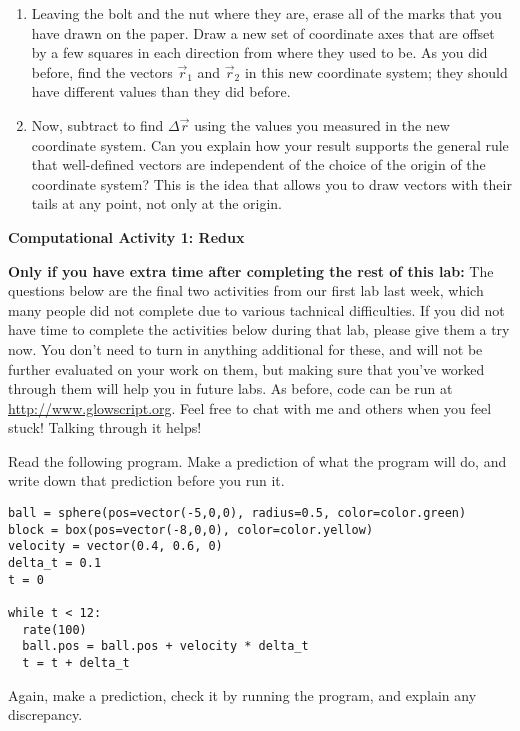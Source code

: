 \documentclass[11pt]{article}
\begin{document}
\begin{enumerate}
\item Leaving the bolt and the nut where they are, erase all of the marks
  that you have drawn on the paper.  Draw a new set of coordinate axes
  that are offset by a few squares in each direction from where they used 
  to be.  As you did before, find the vectors ${\vec{r}_1}$ and ${\vec{r}_2}$ 
  in this new coordinate system; they should have different values
  than they did before. 

\item Now, subtract to find $\Delta {\vec r}$ using the values you measured
  in the new coordinate system.  Can you explain how your result supports the 
  general rule that well-defined vectors are independent of the choice of the 
  origin of the coordinate system?  This is the idea that allows you to
  draw vectors with their tails at any point, not only at the origin.

\end{enumerate}







\newpage

\begin{center}
\medskip
{\bf{Computational Activity 1: Redux}} 
\end{center}
\medskip
\textbf{Only if you have extra time after completing the rest of this lab:} The questions below are the final two activities from our first lab last week, which many people did not complete due to various tachnical difficulties. If you did not have time to complete the activities below during that lab, please give them a try now. You don't need to turn in anything additional for these, and will not be further evaluated on your work on them, but making sure that you've worked through them will help you in future labs. As before, code can be run at \url{http://www.glowscript.org}. Feel free to chat with me and others when you feel stuck! Talking through it helps!




Read the following program. Make a prediction of what the program will do, and write down that prediction 
before you run it. 
{\small{
\begin{verbatim}
ball = sphere(pos=vector(-5,0,0), radius=0.5, color=color.green)
block = box(pos=vector(-8,0,0), color=color.yellow)
velocity = vector(0.4, 0.6, 0)
delta_t = 0.1
t = 0

while t < 12:
  rate(100)
  ball.pos = ball.pos + velocity * delta_t
  t = t + delta_t
\end{verbatim}
}}
\noindent Again, make a prediction, check it by running the program, and explain
any discrepancy.
\end{document}
